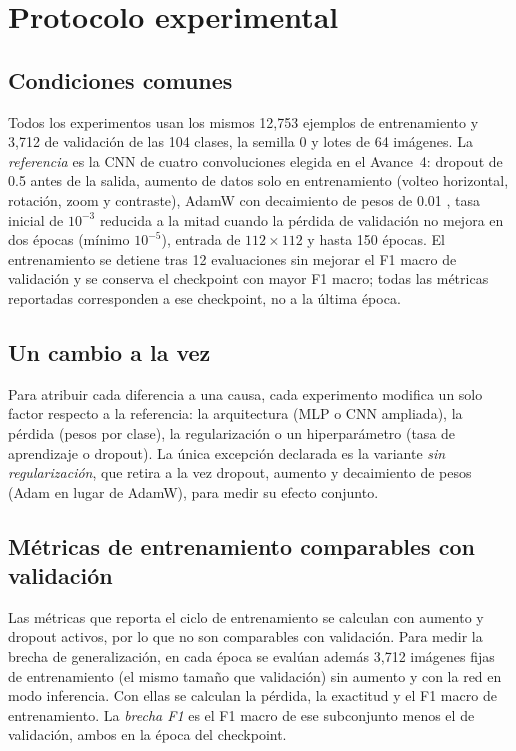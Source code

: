 \section{Protocolo experimental}

\subsection{Condiciones comunes}

Todos los experimentos usan los mismos 12,753 ejemplos de entrenamiento y 3,712
de validación de las 104 clases, la semilla 0 y lotes de 64 imágenes. La
\emph{referencia} es la CNN de cuatro convoluciones elegida en el Avance~4:
dropout de 0.5 antes de la salida, aumento de datos solo en entrenamiento
(volteo horizontal, rotación, zoom y contraste), AdamW con decaimiento de pesos
de 0.01 \autocite{loshchilov2019adamw}, tasa inicial de $10^{-3}$ reducida a la
mitad cuando la pérdida de validación no mejora en dos épocas (mínimo
$10^{-5}$), entrada de $112\times112$ y hasta 150 épocas. El entrenamiento se
detiene tras 12 evaluaciones sin mejorar el F1 macro de validación y se conserva
el checkpoint con mayor F1 macro; todas las métricas reportadas corresponden a
ese checkpoint, no a la última época.

\subsection{Un cambio a la vez}

Para atribuir cada diferencia a una causa, cada experimento modifica un solo
factor respecto a la referencia: la arquitectura (MLP o CNN ampliada), la pérdida (pesos por clase), la regularización o un
hiperparámetro (tasa de aprendizaje o dropout). La única excepción declarada
es la variante \emph{sin regularización}, que retira a la vez dropout, aumento y decaimiento de pesos (Adam en lugar de AdamW), para medir
su efecto conjunto.

\subsection{Métricas de entrenamiento comparables con validación}

Las métricas que reporta el ciclo de entrenamiento se calculan con aumento y
dropout activos, por lo que no son comparables con validación. Para medir la
brecha de generalización, en cada época se evalúan además 3,712 imágenes fijas de
entrenamiento (el mismo tamaño que validación) sin aumento y con la red en modo
inferencia. Con ellas se calculan la pérdida, la exactitud y el F1 macro de
entrenamiento. La \emph{brecha F1} es el F1 macro de ese subconjunto menos el de
validación, ambos en la época del checkpoint.

